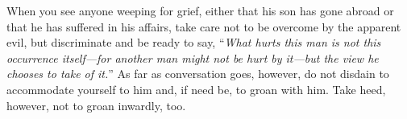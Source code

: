 When you see anyone weeping for grief, either that his son has gone
abroad or that he has suffered in his affairs, take care not to be
overcome by the apparent evil, but discriminate and be ready to say,
``\emph{What hurts this man is not this occurrence itself---for another man might
not be hurt by it---but the view he chooses to take of it.}'' As far as
conversation goes, however, do not disdain to accommodate yourself to him
and, if need be, to groan with him. Take heed, however, not to groan
inwardly, too.
